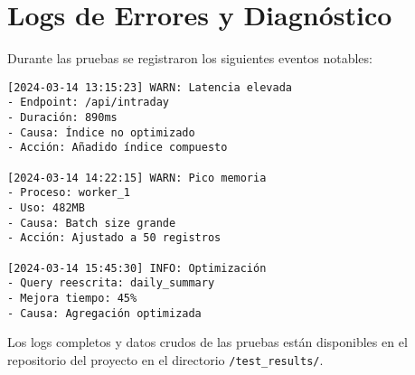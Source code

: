 \section{Logs de Errores y Diagnóstico}
\label{anexo:pruebas:logs}

Durante las pruebas se registraron los siguientes eventos notables:

\begin{verbatim}
[2024-03-14 13:15:23] WARN: Latencia elevada
- Endpoint: /api/intraday
- Duración: 890ms
- Causa: Índice no optimizado
- Acción: Añadido índice compuesto

[2024-03-14 14:22:15] WARN: Pico memoria
- Proceso: worker_1
- Uso: 482MB
- Causa: Batch size grande
- Acción: Ajustado a 50 registros

[2024-03-14 15:45:30] INFO: Optimización
- Query reescrita: daily_summary
- Mejora tiempo: 45%
- Causa: Agregación optimizada
\end{verbatim}

Los logs completos y datos crudos de las pruebas están disponibles en el repositorio del proyecto \cite{github_repo_proyecto} en el directorio \texttt{/test\_results/}.